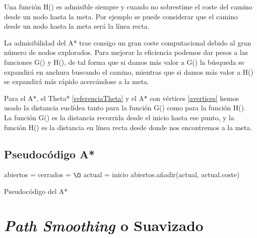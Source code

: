 Una función H() es admisible siempre y cuando no sobrestime el coste del camino desde un nodo hasta la meta. Por ejemplo se puede considerar que el camino desde un nodo hasta la meta será la línea recta.

La admisibilidad del A* trae consigo un gran coste computacional debido al gran número de nodos explorados. Para mejorar la eficiencia podemos dar pesos a las funciones G() y H(), de tal forma que si damos más valor a G() la búsqueda se expandirá en anchura buscando el camino, mientras que si damos más valor a H() se expandirá más rápido acercándose a la meta.

Para el A*, el Theta* \ref{referenciaTheta} y el A* con vértices \ref{avertices} hemos usado la distancia euclídea tanto para la función G() como para la función H(). La función G() es la distancia recorrida desde el inicio hasta ese punto, y la función H() es la distancia en línea recta desde donde nos encontremos a la meta.

\subsection{Pseudocódigo A*}

\begin{algorithm}[H]
 abiertos = cerrados = $\O$\;
 actual = inicio\;
 abiertos.añadir(actual, actual.coste)\;

 \nl{}
 \caption{Pseudocódigo del A*}
\end{algorithm}

\section{\textit{Path Smoothing} o Suavizado}

